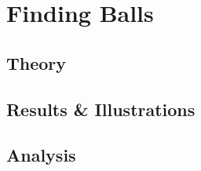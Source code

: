\section{Finding Balls}
\subsection{Theory}
\subsection{Results \& Illustrations}
\subsection{Analysis}